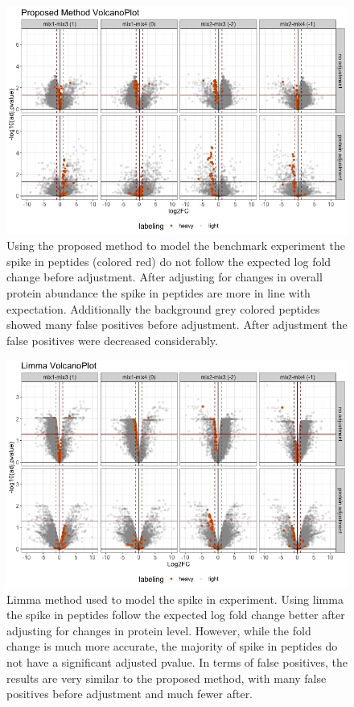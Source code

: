 \documentclass[mcp]{article}
\numberwithin{figure}{section} %
\numberwithin{table}{section}
\begin{document}
\begin{figure}[ht]
\centering
\includegraphics[width=1\textwidth]{images/spike_in_msstatsptm_volcano.png}
\caption{Using the proposed method to model the benchmark experiment the spike in peptides (colored red) do not follow the expected log fold change before adjustment. After adjusting for changes in overall protein abundance the spike in peptides are more in line with expectation. Additionally the background grey colored peptides showed many false positives before adjustment. After adjustment the false positives were decreased considerably.
}\label{fig:spikein_prop_volcano}
\end{figure}

\begin{figure}[ht]
\centering
\includegraphics[width=1\textwidth]{images/spike_in_limma_volcano.png}
\caption{Limma method used to model the spike in experiment. Using limma the spike in peptides follow the expected log fold change better after adjusting for changes in protein level. However, while the fold change is much more accurate, the majority of spike in peptides do not have a significant adjusted pvalue. In terms of false positives, the results are very similar to the proposed method, with many false positives before adjustment and much fewer after.
}\label{fig:spikein_limma_volcano}
\end{figure}
\end{document}
